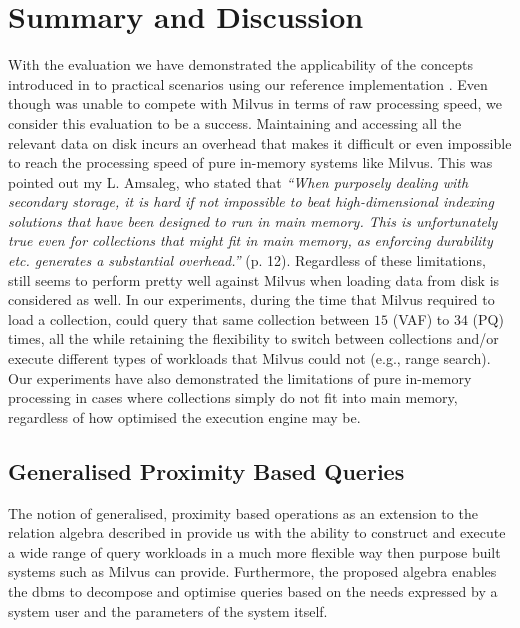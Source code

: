 \newpage
 
\section{Summary and Discussion}
\label{section:discussion}

With the evaluation we have demonstrated the applicability of the concepts introduced in  to practical scenarios using our reference implementation \cottontail{}. Even though \cottontail{} was unable to compete with Milvus in terms of raw processing speed, we consider this evaluation to be a success. Maintaining and accessing all the relevant data on disk incurs an overhead that makes it difficult or even impossible to reach the processing speed of pure in-memory systems like Milvus. This was pointed out my L. Amsaleg, who stated that \emph{``When purposely dealing with secondary storage, it is hard if not impossible to beat high-dimensional indexing solutions that have been designed to run in main memory. This is unfortunately true even for collections that might fit in main memory, as enforcing durability etc. generates a substantial overhead.''} \cite{Amsaleg:2014Database} (p. 12). Regardless of these limitations, \cottontail{} still seems to perform pretty well against Milvus when loading data from disk is considered as well. In our experiments, during the time that Milvus required to load a collection, \cottontail{} could query that same collection between $15$ (VAF) to $34$ (PQ) times, all the while retaining the flexibility to switch between collections and/or execute different types of workloads that Milvus could not (e.g., range search). Our experiments have also demonstrated the limitations of pure in-memory processing in cases where collections simply do not fit into main memory, regardless of how optimised the execution engine may be.

\subsection{Generalised Proximity Based Queries}

The notion of generalised, proximity based operations as an extension to the relation algebra described in  provide us with the ability to construct and execute a wide range of query workloads in a much more flexible way then purpose built systems such as Milvus \cite{Wang:2021Milvus} can provide. Furthermore, the proposed algebra enables the \acrshort{dbms} to decompose and optimise queries based on the needs expressed by a system user and the parameters of the system itself. 

